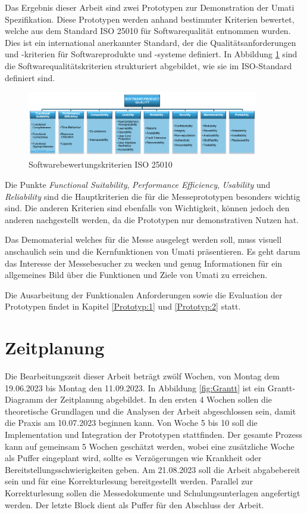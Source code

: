 \documentclass[a4paper, 12pt, oneside, toc=listofnumbered, bibliography=totoc]{scrbook}
\begin{document}
	
	Das Ergebnis dieser Arbeit sind zwei Prototypen zur Demonstration der \ac{Umati} Spezifikation. Diese Prototypen werden anhand bestimmter Kriterien bewertet, welche aus dem Standard ISO 25010 für Softwarequalität entnommen wurden. Dies ist ein international anerkannter Standard, der die Qualitätsanforderungen und -kriterien für Softwareprodukte und -systeme definiert. In Abbildung \ref{fig:ISO25010} sind die Softwarequalitätskriterien strukturiert abgebildet, wie sie im ISO-Standard definiert sind. 
	
	\begin{figure}[H]
		\centering
		\includegraphics[width=0.9\textwidth]{res/diagramms/iso25010.png}
		\caption{Softwarebewertungskriterien ISO 25010} 
		\label{fig:ISO25010}
	\end{figure}
	
	Die Punkte \textit{Functional Suitability}, \textit{Performance Efficiency}, \textit{Usability} und \textit{Reliability} sind die Hauptkriterien die für die Messeprototypen besonders wichtig sind. Die anderen Kriterien sind ebenfalls von Wichtigkeit, können jedoch den anderen nachgestellt werden, da die Prototypen nur demonstrativen Nutzen hat. 
	
	Das Demomaterial welches für die Messe ausgelegt werden soll, muss visuell anschaulich sein und die Kernfunktionen von \ac{Umati} präsentieren. Es geht darum das Interesse der Messebesucher zu wecken und genug Informationen für ein allgemeines Bild über die Funktionen und Ziele von \ac{Umati} zu erreichen. 
	
	Die Ausarbeitung der Funktionalen Anforderungen sowie die Evaluation der Prototypen findet in Kapitel \ref{Prototyp:1} und \ref{Prototyp:2} statt.
	
	\section{Zeitplanung}
	
	Die Bearbeitungszeit dieser Arbeit beträgt zwölf Wochen, von Montag dem 19.06.2023 bis Montag den 11.09.2023. In Abbildung \ref{fig:Grantt} ist ein Grantt-Diagramm der Zeitplanung abgebildet. In den ersten 4 Wochen sollen die theoretische Grundlagen und die Analysen der Arbeit abgeschlossen sein, damit die Praxis am 10.07.2023 beginnen kann. Von Woche 5 bis 10 soll die Implementation und Integration der Prototypen stattfinden. Der gesamte Prozess kann auf gemeinsam 5 Wochen geschätzt werden, wobei eine zusätzliche Woche als Puffer eingeplant wird, sollte es Verzögerungen wie Krankheit oder Bereitstellungsschwierigkeiten geben. Am 21.08.2023 soll die Arbeit abgabebereit sein und für eine Korrekturlesung bereitgestellt werden. Parallel zur Korrekturlesung sollen die Messedokumente und Schulungsunterlagen angefertigt werden. Der letzte Block dient als Puffer für den Abschluss der Arbeit.
	
\end{document}
